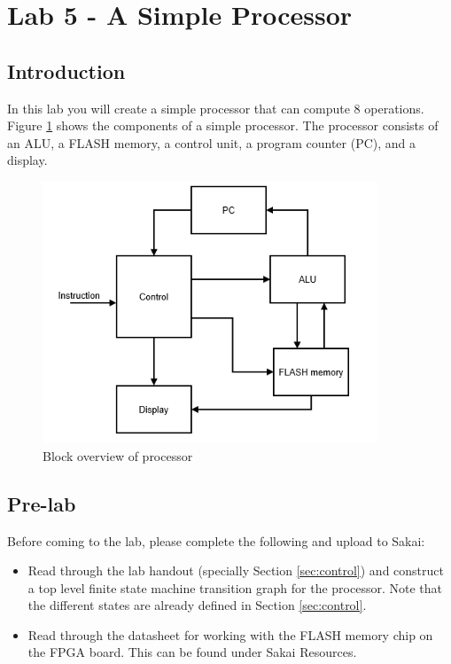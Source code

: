 \section{Lab 5 - A Simple Processor}

\subsection{Introduction}
In this lab you will create a simple processor that can compute 8 operations. Figure \ref{fig:block} shows the components of a simple processor. The processor consists of an ALU, a FLASH memory, a control unit, a program counter (PC), and a display.  

\begin{figure}[H]
	\centering
	\includegraphics[width=100mm]{Lab5/figures/block.png}
	\caption{Block overview of processor}
	\label{fig:block}
\end{figure} 

	
\subsection{Pre-lab}

Before coming to the lab, please complete the following and upload to Sakai:
\begin{itemize}
	\item Read through the  lab handout (specially Section \ref{sec:control}) and construct a top level finite state machine transition graph for the processor. Note that the different states are already defined in Section \ref{sec:control}.

	\item Read through the datasheet for working with the FLASH memory chip on the FPGA board. This can be found under Sakai Resources.
\end{itemize}

